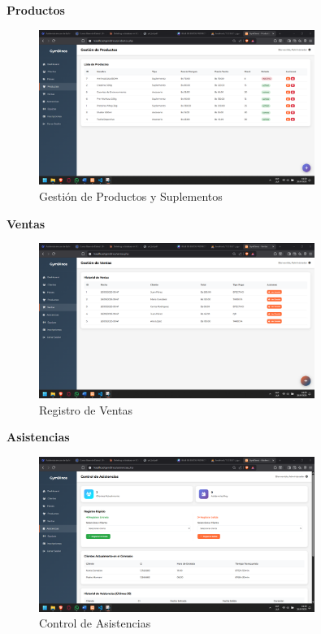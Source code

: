 \documentclass[12pt, letterpaper]{article}
\begin{document}
\textbf{Productos}
\begin{figure}[ht]
\centering
\includegraphics[width=0.8\textwidth]{productos.png}
\caption{Gestión de Productos y Suplementos}
\label{fig:productos}
\end{figure}

\textbf{Ventas}
\begin{figure}[ht]
\centering
\includegraphics[width=0.8\textwidth]{ventas.png}
\caption{Registro de Ventas}
\label{fig:ventas}
\end{figure}
\newpage

\textbf{Asistencias}
\begin{figure}[ht]
\centering
\includegraphics[width=0.8\textwidth]{asistencias.png}
\caption{Control de Asistencias}
\label{fig:asistencias}
\end{figure}
\end{document}
